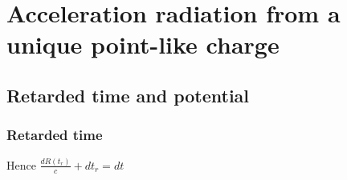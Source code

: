 \documentclass[a4paper,11pt,twoside,titlepage,openright]{book}
\numberwithin{equation}{section}
\newcommand{\ud}[1]{\underline{#1}}
\DeclareMathOperator{\ei}{\underline{e}_1}
\DeclareMathOperator{\et}{\underline{e}_2}
\DeclareMathOperator{\DD}{\cos(\theta)^2 - \sin(\psi)^2}
\begin{document}













\appendix
\chapter{Acceleration radiation from a unique point-like charge}

\section{Retarded time and potential}
\subsection{Retarded time}


Hence $\frac{dR(t_r)}{c} + dt_r = dt$
\end{document}
